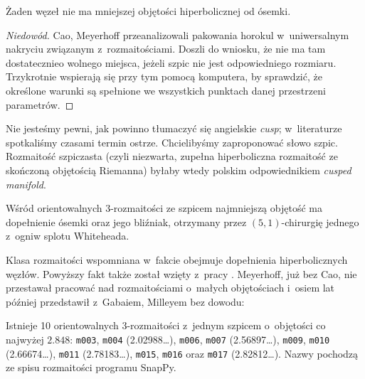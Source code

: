 \begin{proposition}
%
%
\label{prp:eight_smallest_volume}%
    Żaden węzeł nie ma mniejszej objętości hiperbolicznej od ósemki.
\end{proposition}

\begin{proof}[Niedowód]
%
%
    Cao, Meyerhoff \cite{cao2001} przeanalizowali pakowania horokul w~uniwersalnym nakryciu związanym z~rozmaitościami.
    Doszli do wniosku, że nie ma tam dostatecznieo wolnego miejsca, jeżeli szpic nie jest odpowiedniego rozmiaru.
%
    Trzykrotnie wspierają się przy tym pomocą komputera, by sprawdzić, że określone warunki są spełnione we wszystkich punktach danej przestrzeni parametrów.
\end{proof}

Nie jesteśmy pewni, jak powinno tłumaczyć się  angielskie \emph{cusp}; w~literaturze spotkaliśmy czasami termin ostrze.
%
Chcielibyśmy zaproponować słowo szpic.
Rozmaitość szpiczasta (czyli niezwarta, zupełna hiperboliczna rozmaitość ze skończoną objętością Riemanna) byłaby wtedy polskim odpowiednikiem \emph{cusped manifold}.

\begin{proposition}
%
    Wśród orientowalnych 3-rozmaitości ze szpicem najmniejszą objętość ma dopełnienie ósemki oraz jego bliźniak, otrzymany przez $(5, 1)$-chirurgię jednego z~ogniw splotu Whiteheada.
%
\end{proposition}

Klasa rozmaitości wspomniana w~fakcie obejmuje dopełnienia hiperbolicznych węzłów.
Powyższy fakt także został wzięty z~pracy \cite{cao2001}.
Meyerhoff, już bez Cao, nie przestawał pracować nad rozmaitościami o~małych objętościach i~osiem lat później przedstawił z~Gabaiem, Milleyem \cite{meyerhoff2009} bez dowodu:
%
%

\begin{proposition}
%
    Istnieje 10 orientowalnych 3-rozmaitości z~jednym szpicem o~objętości co najwyżej $2.848$: \texttt{m003}, \texttt{m004} (2.02988\ldots), \texttt{m006}, \texttt{m007} (2.56897\ldots), \texttt{m009}, \texttt{m010} (2.66674\ldots), \texttt{m011} (2.78183\ldots), \texttt{m015}, \texttt{m016} oraz \texttt{m017} (2.82812\ldots).
    Nazwy pochodzą ze spisu rozmaitości programu SnapPy.
\end{proposition}


